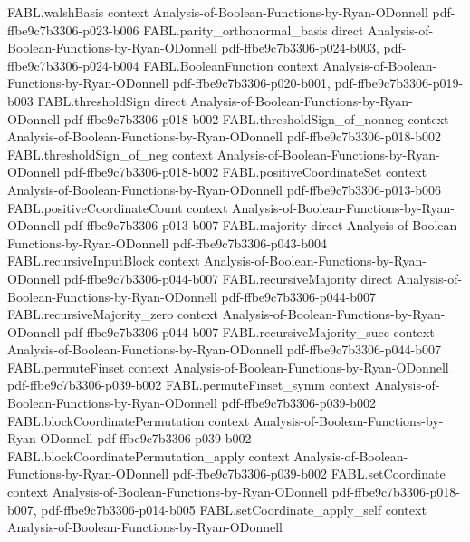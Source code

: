 \begin{theorem}
\proofstep
  {FABL.walshBasis}
  {context}
  {Analysis-of-Boolean-Functions-by-Ryan-ODonnell}
  {pdf-ffbe9c7b3306-p023-b006}
\proofstep
  {FABL.parity_orthonormal_basis}
  {direct}
  {Analysis-of-Boolean-Functions-by-Ryan-ODonnell}
  {pdf-ffbe9c7b3306-p024-b003,
    pdf-ffbe9c7b3306-p024-b004}
\proofstep
  {FABL.BooleanFunction}
  {context}
  {Analysis-of-Boolean-Functions-by-Ryan-ODonnell}
  {pdf-ffbe9c7b3306-p020-b001,
    pdf-ffbe9c7b3306-p019-b003}
\proofstep
  {FABL.thresholdSign}
  {direct}
  {Analysis-of-Boolean-Functions-by-Ryan-ODonnell}
  {pdf-ffbe9c7b3306-p018-b002}
\proofstep
  {FABL.thresholdSign_of_nonneg}
  {context}
  {Analysis-of-Boolean-Functions-by-Ryan-ODonnell}
  {pdf-ffbe9c7b3306-p018-b002}
\proofstep
  {FABL.thresholdSign_of_neg}
  {context}
  {Analysis-of-Boolean-Functions-by-Ryan-ODonnell}
  {pdf-ffbe9c7b3306-p018-b002}
\proofstep
  {FABL.positiveCoordinateSet}
  {context}
  {Analysis-of-Boolean-Functions-by-Ryan-ODonnell}
  {pdf-ffbe9c7b3306-p013-b006}
\proofstep
  {FABL.positiveCoordinateCount}
  {context}
  {Analysis-of-Boolean-Functions-by-Ryan-ODonnell}
  {pdf-ffbe9c7b3306-p013-b007}
\proofstep
  {FABL.majority}
  {direct}
  {Analysis-of-Boolean-Functions-by-Ryan-ODonnell}
  {pdf-ffbe9c7b3306-p043-b004}
\proofstep
  {FABL.recursiveInputBlock}
  {context}
  {Analysis-of-Boolean-Functions-by-Ryan-ODonnell}
  {pdf-ffbe9c7b3306-p044-b007}
\proofstep
  {FABL.recursiveMajority}
  {direct}
  {Analysis-of-Boolean-Functions-by-Ryan-ODonnell}
  {pdf-ffbe9c7b3306-p044-b007}
\proofstep
  {FABL.recursiveMajority_zero}
  {context}
  {Analysis-of-Boolean-Functions-by-Ryan-ODonnell}
  {pdf-ffbe9c7b3306-p044-b007}
\proofstep
  {FABL.recursiveMajority_succ}
  {context}
  {Analysis-of-Boolean-Functions-by-Ryan-ODonnell}
  {pdf-ffbe9c7b3306-p044-b007}
\proofstep
  {FABL.permuteFinset}
  {context}
  {Analysis-of-Boolean-Functions-by-Ryan-ODonnell}
  {pdf-ffbe9c7b3306-p039-b002}
\proofstep
  {FABL.permuteFinset_symm}
  {context}
  {Analysis-of-Boolean-Functions-by-Ryan-ODonnell}
  {pdf-ffbe9c7b3306-p039-b002}
\proofstep
  {FABL.blockCoordinatePermutation}
  {context}
  {Analysis-of-Boolean-Functions-by-Ryan-ODonnell}
  {pdf-ffbe9c7b3306-p039-b002}
\proofstep
  {FABL.blockCoordinatePermutation_apply}
  {context}
  {Analysis-of-Boolean-Functions-by-Ryan-ODonnell}
  {pdf-ffbe9c7b3306-p039-b002}
\proofstep
  {FABL.setCoordinate}
  {context}
  {Analysis-of-Boolean-Functions-by-Ryan-ODonnell}
  {pdf-ffbe9c7b3306-p018-b007,
    pdf-ffbe9c7b3306-p014-b005}
\proofstep
  {FABL.setCoordinate_apply_self}
  {context}
  {Analysis-of-Boolean-Functions-by-Ryan-ODonnell}

\end{theorem}

